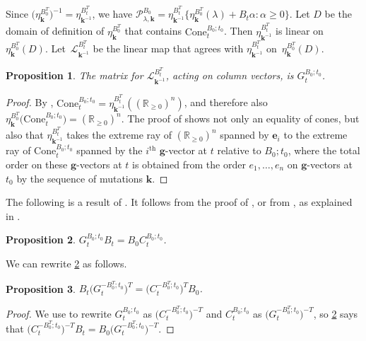 \documentclass{amsart}
\newtheorem{proposition}{Proposition}[section]
\theoremstyle{definition}
\theoremstyle{remark}
\numberwithin{equation}{section}
\newcommand{\reals}{\mathbb R}
\newcommand{\sett}[1]{{\bigl\lbrace #1 \bigr\rbrace}}
\renewcommand{\th}{^\text{th}}
\newcommand{\0}{{\mathbf{0}}}
\newcommand{\Cone}{\mathrm{Cone}}
\newcommand{\g}{\mathbf{g}}
\newcommand{\kk}{{\boldsymbol{k}}}
\newcommand{\e}{\mathbf{e}}
\renewcommand{\L}{\mathcal{L}}
\renewcommand{\P}{\mathcal{P}}
\renewcommand{\th}{^\text{th}}
\begin{document}

Since $\bigl(\eta_{\kk}^{B_0^T}\bigr)^{-1}=\eta_{\kk^{-1}}^{B_t^T}$, we have $\P^{B_0}_{\lambda,\kk}=\eta_{\kk^{-1}}^{B_t^T}\sett{\eta_\kk^{B_0^T}(\lambda)+B_t\alpha:\alpha\ge0}$.
Let $D$ be the domain of definition of $\eta_{\kk}^{B_0^T}$  that contains $\Cone^{B_0;t_0}_t$.
Then $\eta_{\kk^{-1}}^{B_t^T}$ is linear on $\eta_{\kk}^{B_0^T}(D)$.
Let~$\L_{\kk^{-1}}^{B_t^T}$ be the linear map that agrees with $\eta_{\kk^{-1}}^{B_t^T}$ on~$\eta_{\kk}^{B_0^T}(D)$.

\begin{proposition}\label{L mat}
The matrix for $\L_{\kk^{-1}}^{B_t^T}$, acting on column vectors, is $G_t^{B_0;t_0}$.
\end{proposition}
\begin{proof}
By \cite[Proposition~8.13]{universal}, $\Cone^{B_0;t_0}_t=\eta_{\kk^{-1}}^{B_t^T}\left(\left(\reals_{\ge0}\right)^n\right)$, and therefore also ${\eta_\kk^{B_0^T}\bigl(\Cone^{B_0;t_0}_t\bigr)=\left(\reals_{\ge0}\right)^n}$.
The proof of \cite[Proposition~8.13]{universal} shows not only an equality of cones, but also that $\eta_{\kk^{-1}}^{B_t^T}$ takes the extreme ray of $\left(\reals_{\ge0}\right)^n$ spanned by $\e_i$ to the extreme ray of $\Cone^{B_0;t_0}_t$ spanned by the $i\th$ $\g$-vector at $t$ relative to $B_0;t_0$, where the total order on these $\g$-vectors at $t$ is obtained from the order $e_1,\ldots,e_n$ on $\g$-vectors at $t_0$ by the sequence of mutations $\kk$.
\end{proof}

The following is a result of \cite{NZ12}.
It follows from the proof of \cite[Proposition~1.3]{NZ12}, or from \cite[(6.14)]{FZ07}, as explained in \cite[Remark~2.1]{NZ12}.

\begin{proposition}\label{GBBC}
$G_t^{B_0;t_0}B_t=B_0C_t^{B_0;t_0}$.
\end{proposition}

We can rewrite \cref{GBBC} as follows.

\begin{proposition}\label{BGCB}
$B_t\bigl(G_t^{-B_0^T;t_0}\bigr)^T=\bigl(C_t^{-B_0^T;t_0}\bigr)^TB_0$.
\end{proposition}
\begin{proof}
We use \cite[Theorem~1.2]{NZ} to rewrite $G_t^{B_0;t_0}$ as $\bigl(C_t^{-B_0^T;t_0}\bigr)^{-T}$ and $C_t^{B_0;t_0}$ as $\bigl(G_t^{-B_0^T;t_0}\bigr)^{-T}$, so \cref{GBBC} says that $\bigl(C_t^{-B_0^T;t_0}\bigr)^{-T}B_t=B_0\bigl(G_t^{-B_0^T;t_0}\bigr)^{-T}$.
\end{proof}
\end{document}
